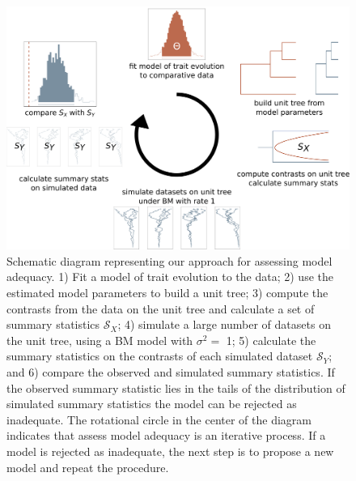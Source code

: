 \documentclass[a4paper,12pt]{article}
\begin{document}
\begin{figure}[p]
  \centering
  \includegraphics[scale=0.28]{figs/flowchart}
  \caption{Schematic diagram representing our approach for assessing model adequacy. 1) Fit a model of trait evolution to the data; 2) use the estimated model parameters to build a unit tree; 3) compute the contrasts from the data on the unit tree and calculate a set of summary statistics $\mathcal{S}_X$; 4) simulate a large number of datasets on the unit tree, using a BM model with $\sigma^2=$ 1; 5) calculate the summary statistics on the contrasts of each simulated dataset $\mathcal{S}_Y$; and 6) compare the observed and simulated summary statistics. If the observed summary statistic lies in the tails of the distribution of simulated summary statistics the model can be rejected as inadequate. The rotational circle in the center of the diagram indicates that assess model adequacy is an iterative process. If a model is rejected as inadequate, the next step is to propose a new model and repeat the procedure.}
  \label{fig:flowchart}
\end{figure}
\end{document}
